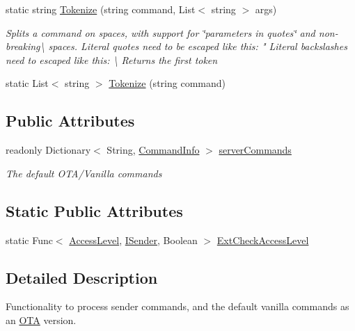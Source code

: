 \begin{DoxyCompactItemize}
static string \hyperlink{class_o_t_a_1_1_command_1_1_command_parser_a875cf42d5817f89605b520e65df504cd}{Tokenize} (string command, List$<$ string $>$ args)
\begin{DoxyCompactList}\small\item\em Splits a command on spaces, with support for \char`\"{}parameters in quotes\char`\"{} and non-\/breaking\textbackslash{} spaces. Literal quotes need to be escaped like this\+: " Literal backslashes need to escaped like this\+: \textbackslash{} Returns the first token \end{DoxyCompactList}\item 
static List$<$ string $>$ \hyperlink{class_o_t_a_1_1_command_1_1_command_parser_a5994f275077adef1c57845c71b6b1b93}{Tokenize} (string command)
\end{DoxyCompactItemize}
\subsection*{Public Attributes}
\begin{DoxyCompactItemize}
\item 
readonly Dictionary$<$ String, \hyperlink{class_o_t_a_1_1_command_1_1_command_info}{Command\+Info} $>$ \hyperlink{class_o_t_a_1_1_command_1_1_command_parser_ade288d8e14619a6261ca0b9302202c7e}{server\+Commands}
\begin{DoxyCompactList}\small\item\em The default O\+T\+A/\+Vanilla commands \end{DoxyCompactList}\end{DoxyCompactItemize}
\subsection*{Static Public Attributes}
\begin{DoxyCompactItemize}
\item 
static Func$<$ \hyperlink{namespace_o_t_a_1_1_command_a8b5f51579148d05d330f1911083e7a8e}{Access\+Level}, \hyperlink{interface_o_t_a_1_1_command_1_1_i_sender}{I\+Sender}, Boolean $>$ \hyperlink{class_o_t_a_1_1_command_1_1_command_parser_a7f158e0f0516051d9ffceb855c99c99e}{Ext\+Check\+Access\+Level}
\end{DoxyCompactItemize}


\subsection{Detailed Description}
Functionality to process sender commands, and the default vanilla commands as an \hyperlink{namespace_o_t_a}{O\+T\+A} version. 



